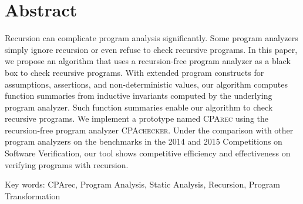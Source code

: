 
\chapter{Abstract}

Recursion can complicate program analysis significantly.
Some program analyzers simply ignore recursion or even refuse to check recursive
programs.
In this paper, we propose an algorithm that uses a recursion-free program
analyzer as a black box to check recursive programs.
With extended program constructs for assumptions, assertions, and
non-deterministic values,
our algorithm computes function summaries from inductive invariants computed by
the underlying program analyzer.
Such function summaries enable our algorithm to check recursive programs.
We implement a prototype named \textsc{CPArec} using the recursion-free program
analyzer \textsc{CPAchecker}.
Under the comparison with other program analyzers on the benchmarks in the 2014
and 2015 Competitions on Software Verification,
our tool shows competitive efficiency and effectiveness on verifying programs
with recursion.

Key words: CPArec, Program Analysis, Static Analysis, Recursion,
Program Transformation
